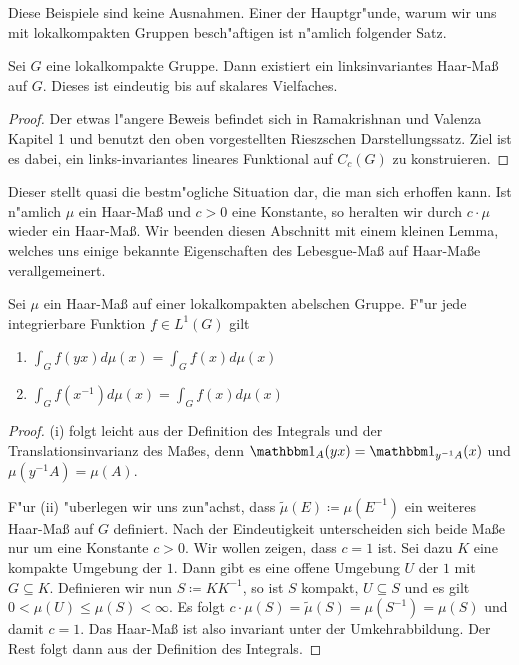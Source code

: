 	Diese Beispiele sind keine Ausnahmen.
	Einer der Hauptgr"unde, warum wir uns mit lokalkompakten Gruppen besch"aftigen ist n"amlich folgender Satz.
	\begin{satz}
	\label{satz:topo:haarmeasure}
		Sei $G$ eine lokalkompakte Gruppe. Dann existiert ein linksinvariantes Haar-Maß auf $G$. Dieses ist eindeutig bis auf skalares Vielfaches.
	\end{satz}
	\begin{proof}
		Der etwas l"angere Beweis befindet sich in Ramakrishnan und Valenza \cite{rama} Kapitel 1 und benutzt den oben vorgestellten Rieszschen Darstellungssatz.
		Ziel ist es dabei, ein links-invariantes lineares Funktional auf $C_c(G)$ zu konstruieren.
	\end{proof}
	Dieser stellt quasi die bestm"ogliche Situation dar, die man sich erhoffen kann. 
	Ist n"amlich $\mu$ ein Haar-Maß und $c>0$ eine Konstante, so heralten wir durch $c\cdot \mu$ wieder ein Haar-Maß. 
	Wir beenden diesen Abschnitt mit einem kleinen Lemma, welches uns einige bekannte Eigenschaften des Lebesgue-Maß auf Haar-Maße verallgemeinert.
	\begin{lemma}Sei $\mu$ ein Haar-Maß auf einer lokalkompakten abelschen Gruppe. F"ur jede integrierbare Funktion $f\in L^{1}(G)$ gilt
		\begin{multicols}{2}
			\begin{enumerate}[label=\emph{(\roman*)}]
				\item $\int_{G} f(yx)d\mu(x) =  \int_{G} f(x)d\mu(x)$
				\item $\int_{G} f(x^{-1})d\mu(x) = \int_{G} f(x)d\mu(x)$
			\end{enumerate}
		\end{multicols}
	\end{lemma}
	\begin{proof}
		(i) folgt leicht aus der Definition des Integrals und der Translationsinvarianz des Maßes, denn $\ind_A(yx) = \ind_{y^{-1}A}(x)$ und $\mu({y^{-1}A}) = \mu(A)$.
		
		F"ur (ii) "uberlegen wir uns zun"achst, dass $\tilde{\mu}(E)\coloneqq  \mu(E^{-1})$ ein weiteres Haar-Maß auf $G$ definiert. 
		Nach der Eindeutigkeit unterscheiden sich beide Maße nur um eine Konstante $c > 0$. Wir wollen zeigen, dass $c=1$ ist.
		Sei dazu $K$ eine kompakte Umgebung der $1$. Dann gibt es eine offene Umgebung $U$ der $1$ mit $G \subseteq K$. Definieren wir nun $S \coloneqq  KK^{-1}$, so ist $S$ kompakt, $U \subseteq S$ und es gilt $0 < \mu(U) \leq \mu(S)<\infty$. 
		Es folgt $ c\cdot \mu(S) = \tilde{\mu}(S) = \mu(S^{-1}) =\mu(S)$ und damit $c=1$. Das Haar-Maß ist also invariant unter der Umkehrabbildung. Der Rest folgt dann aus der Definition des Integrals.
	\end{proof}
	
